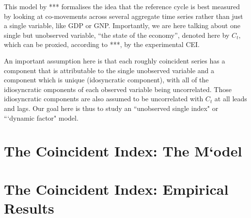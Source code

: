 \documentclass[12pt]{article}
\begin{document}
	\maketitle
	This model by ***  formalises the idea that  the reference cycle is best measured  by looking at co-movements  across several aggregate time series rather than just a single variable, like GDP or  GNP. Importantly, we are here talking about one single but unobserved variable, ``the state of the economy'', denoted here by $C_t$, which can be proxied, according to ***, by the experimental CEI.
	
	An important assumption here is that each roughly coincident series has a component that is attributable to the single unobserved variable and a component which is unique  (idosyncratic component), with all of the idiosyncratic omponents of each observed variable being uncorrelated. Those idiosyncratic components are also assumed to be uncorrelated with $C_t$ at all leads and lags. Our goal here is thus to study an ``unobserved single index" or ```dynamic factor" model.
	
	\section{The Coincident Index: The M`odel }
	
	
	
	\section{The Coincident Index: Empirical Results}
	


%
%	
%	
	
%	
	
	
\end{document}

